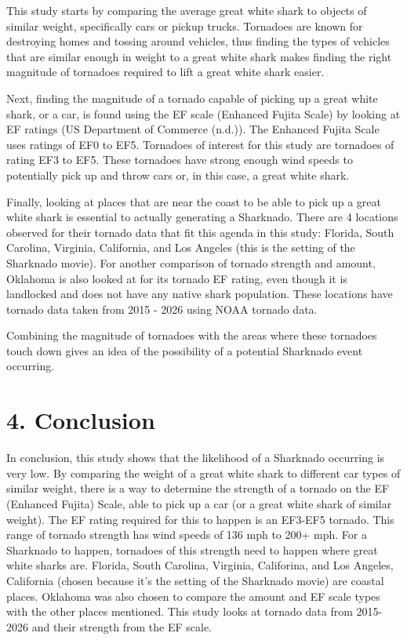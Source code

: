 \documentclass[
  letterpaper,
  DIV=11,
  numbers=noendperiod]{scrreprt}
\begin{document}
This study starts by comparing the average great white shark to objects
of similar weight, specifically cars or pickup trucks. Tornadoes are
known for destroying homes and tossing around vehicles, thus finding the
types of vehicles that are similar enough in weight to a great white
shark makes finding the right magnitude of tornadoes required to lift a
great white shark easier.

Next, finding the magnitude of a tornado capable of picking up a great
white shark, or a car, is found using the EF scale (Enhanced Fujita
Scale) by looking at EF ratings (US Department of Commerce (n.d.)). The
Enhanced Fujita Scale uses ratings of EF0 to EF5. Tornadoes of interest
for this study are tornadoes of rating EF3 to EF5. These tornadoes have
strong enough wind speeds to potentially pick up and throw cars or, in
this case, a great white shark.

Finally, looking at places that are near the coast to be able to pick up
a great white shark is essential to actually generating a Sharknado.
There are 4 locations observed for their tornado data that fit this
agenda in this study: Florida, South Carolina, Virginia, California, and
Los Angeles (this is the setting of the Sharknado movie). For another
comparison of tornado strength and amount, Oklahoma is also looked at
for its tornado EF rating, even though it is landlocked and does not
have any native shark population. These locations have tornado data
taken from 2015 - 2026 using NOAA tornado data.

Combining the magnitude of tornadoes with the areas where these
tornadoes touch down gives an idea of the possibility of a potential
Sharknado event occurring.

\chapter{4. Conclusion}\label{conclusion-1}

In conclusion, this study shows that the likelihood of a Sharknado
occurring is very low. By comparing the weight of a great white shark to
different car types of similar weight, there is a way to determine the
strength of a tornado on the EF (Enhanced Fujita) Scale, able to pick up
a car (or a great white shark of similar weight). The EF rating required
for this to happen is an EF3-EF5 tornado. This range of tornado strength
has wind speeds of 136 mph to 200+ mph. For a Sharknado to happen,
tornadoes of this strength need to happen where great white sharks are.
Florida, South Carolina, Virginia, Califorina, and Los Angeles,
California (chosen because it's the setting of the Sharknado movie) are
coastal places. Oklahoma was also chosen to compare the amount and EF
scale types with the other places mentioned. This study looks at tornado
data from 2015-2026 and their strength from the EF scale.
\end{document}
